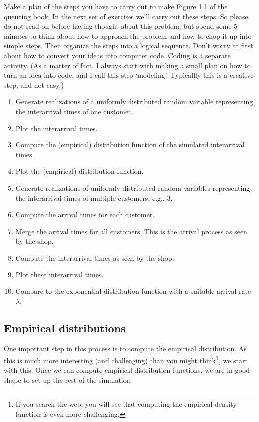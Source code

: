 \documentclass{scrartcl}
\begin{document}
\begin{exercise}
  Make a plan of the steps you have to carry out to make Figure 1.1 of the queueing book. In the next set of exercises we'll carry out these steps. So please do not read on before having thought about this problem, but   spend some 5 minutes to think about how to approach the problem and how to chop it up into simple steps. Then organize the steps into a logical sequence. Don't worry at first about how to convert your ideas into computer code. Coding is a separate activity.  (As a matter of fact, I always start with making a small plan on how to turn an idea into code, and I call this step `modeling'. Typicallly this is a creative step, and not easy.) 

  \begin{solution}
    \begin{enumerate}
    \item Generate realizations of a uniformly distributed random variable representing the interarrival times of one customer.
    \item Plot the interarrival times.
    \item Compute the (empirical) distribution function of the simulated interarrival times.
    \item Plot the (empirical) distribution function.
    \item Generate realizations of uniformly distributed random variables representing the interarrival times of multiple customers, e.g., 3. 
    \item Compute the arrival times for each customer.
    \item Merge  the arrival times for all customers. This is the arrival process as seen by the shop.
    \item Compute the interarrival times as seen by the shop.
    \item Plot these interarrival times.
    \item Compare to the exponential distribution function with a suitable arrival rate $\lambda$. 
    \end{enumerate}
  \end{solution}
\end{exercise}

\subsection{Empirical distributions}
\label{sec:empir-distr}

One important step in this process is to compute the empirical distribution. As this is much more interesting (and challenging) than you might think\footnote{If you search the web, you will see that computing the empirical density function is even more challenging.}, we start with this. Once we can compute empirical distribution functions, we are in good shape to set up the rest of the simulation. 
\end{document}

